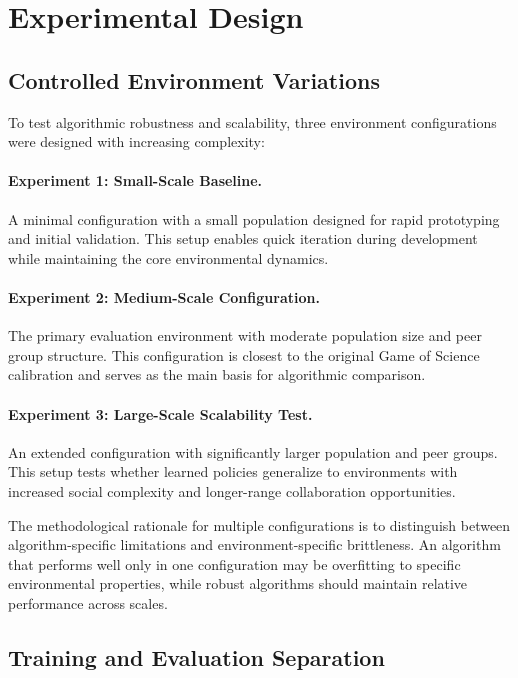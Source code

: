 \documentclass[english,bachelor]{hsluthesis}
\begin{document}
\section{Experimental Design}

\subsection{Controlled Environment Variations}

To test algorithmic robustness and scalability, three environment configurations were designed with increasing complexity:

\paragraph{Experiment 1: Small-Scale Baseline.}
A minimal configuration with a small population designed for rapid prototyping and initial validation. This setup enables quick iteration during development while maintaining the core environmental dynamics.

\paragraph{Experiment 2: Medium-Scale Configuration.}
The primary evaluation environment with moderate population size and peer group structure. This configuration is closest to the original Game of Science calibration and serves as the main basis for algorithmic comparison.

\paragraph{Experiment 3: Large-Scale Scalability Test.}
An extended configuration with significantly larger population and peer groups. This setup tests whether learned policies generalize to environments with increased social complexity and longer-range collaboration opportunities.

The methodological rationale for multiple configurations is to distinguish between algorithm-specific limitations and environment-specific brittleness. An algorithm that performs well only in one configuration may be overfitting to specific environmental properties, while robust algorithms should maintain relative performance across scales.

\subsection{Training and Evaluation Separation}
\end{document}
